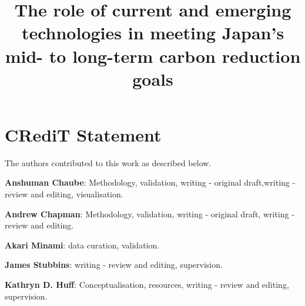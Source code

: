 \documentclass[review]{elsarticle}
\begin{document}
\begin{frontmatter}
\title{The role of current and emerging technologies in meeting Japan's mid- to long-term carbon reduction goals}
\end{frontmatter}
\section*{CRediT Statement}

The authors contributed to this work as described below.

\textbf{Anshuman Chaube}: Methodology, validation, writing - original draft,writing - review and editing, visualisation.

\textbf{Andrew Chapman}: Methodology, validation,  writing - original draft, writing - review and editing.

\textbf{Akari Minami}: data curation, validation.

\textbf{James Stubbins}: writing - review and editing, supervision. 

\textbf{Kathryn D. Huff}: Conceptualisation, resources, writing - review and editing, supervision.
\end{document}
